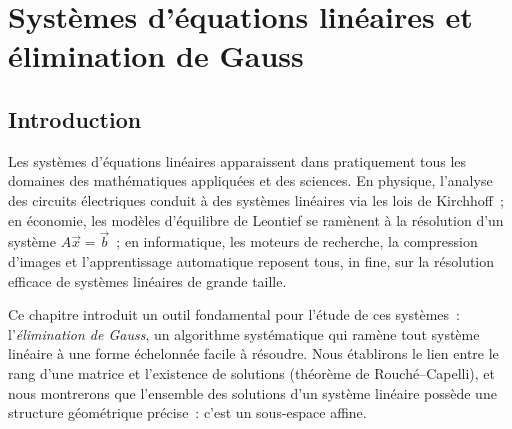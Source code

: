 
\chapter{Systèmes d'équations linéaires et élimination de Gauss}\label{ch:systemes-lineaires}

\section*{Introduction}

Les systèmes d'équations linéaires apparaissent
dans pratiquement tous les domaines des mathématiques appliquées et des
sciences. En physique, l'analyse des circuits électriques conduit à des
systèmes linéaires via les lois de Kirchhoff~;
en économie, les modèles d'équilibre de Leontief
se ramènent à la résolution d'un système $A\vec{x}=\vec{b}$~; en
informatique, les moteurs de recherche, la compression d'images et
l'apprentissage automatique reposent tous, in fine, sur la résolution
efficace de systèmes linéaires de grande taille.

\medskip

Ce chapitre introduit un outil fondamental pour l'étude de ces systèmes~:
l'\emph{élimination de Gauss}, un algorithme
systématique qui ramène tout système linéaire à une forme échelonnée
facile à résoudre. Nous établirons le lien entre le rang d'une matrice et
l'existence de solutions (théorème de Rouché--Capelli), et nous montrerons
que l'ensemble des solutions d'un système linéaire possède une structure
géométrique précise~: c'est un sous-espace affine.

\medskip

